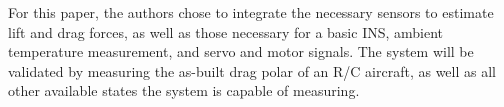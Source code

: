 For this paper, the authors chose to integrate the necessary sensors to estimate lift and drag forces, as well as those necessary for a basic INS, ambient temperature measurement, and servo and motor signals. The system will be validated by measuring the as-built drag polar of an R/C aircraft, as well as all other available states the system is capable of measuring.